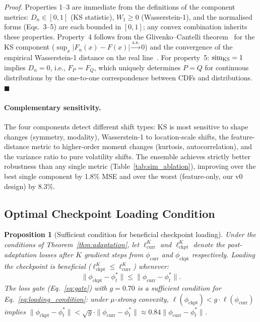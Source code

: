 \documentclass[journal]{IEEEtran}
\newtheorem{proposition}{Proposition}
\renewenvironment{proof}[1][Proof]{\noindent\textit{#1.}\space}{\hfill$\blacksquare$\par\medskip}
\begin{document}
\begin{proof}
Properties 1--3 are immediate from the definitions of the component metrics: $D_n \in [0,1]$ (KS statistic), $W_1 \geq 0$ (Wasserstein-1), and the normalised forms (Eqs.~3--5) are each bounded in $[0,1]$; any convex combination inherits these properties. Property~4 follows from the Glivenko--Cantelli theorem~\cite{vaart1998asymptotic} for the KS component ($\sup_x |F_n(x) - F(x)| \xrightarrow{\text{a.s.}} 0$) and the convergence of the empirical Wasserstein-1 distance on the real line~\cite{bobkov2019onedimensional}. For property~5: $\textup{sim}_{\text{KS}} = 1$ implies $D_n = 0$, i.e., $F_P = F_Q$, which uniquely determines $P = Q$ for continuous distributions by the one-to-one correspondence between CDFs and distributions.
\end{proof}

\paragraph{Complementary sensitivity.} The four components detect different shift types: KS is most sensitive to shape changes (symmetry, modality), Wasserstein-1 to location-scale shifts, the feature-distance metric to higher-order moment changes (kurtosis, autocorrelation), and the variance ratio to pure volatility shifts. The ensemble achieves strictly better robustness than any single metric (Table~\ref{tab:sim_ablation}), improving over the best single component by 1.8\% MSE and over the worst (feature-only, our v0 design) by 8.3\%.

\subsection{Optimal Checkpoint Loading Condition}
\label{sec:theory_loading}

\begin{proposition}[Sufficient condition for beneficial checkpoint loading]
\label{prop:loading}
Under the conditions of Theorem~\ref{thm:adaptation}, let $\ell^K_{\text{curr}}$ and $\ell^K_{\text{ckpt}}$ denote the post-adaptation losses after $K$ gradient steps from $\phi_{\text{curr}}$ and $\phi_{\text{ckpt}}$ respectively. Loading the checkpoint is beneficial ($\ell^K_{\text{ckpt}} \leq \ell^K_{\text{curr}}$) whenever:
\begin{equation}
    \|\phi_{\text{ckpt}} - \phi^*_t\| \leq \|\phi_{\text{curr}} - \phi^*_t\|.
    \label{eq:loading_condition}
\end{equation}
The loss gate (Eq.~\ref{eq:gate}) with $g = 0.70$ is a sufficient condition for Eq.~\ref{eq:loading_condition}: under $\mu$-strong convexity, $\ell(\phi_{\text{ckpt}}) < g \cdot \ell(\phi_{\text{curr}})$ implies $\|\phi_{\text{ckpt}} - \phi^*_t\| < \sqrt{g} \cdot \|\phi_{\text{curr}} - \phi^*_t\| \approx 0.84 \|\phi_{\text{curr}} - \phi^*_t\|$.
\end{proposition}
\end{document}
